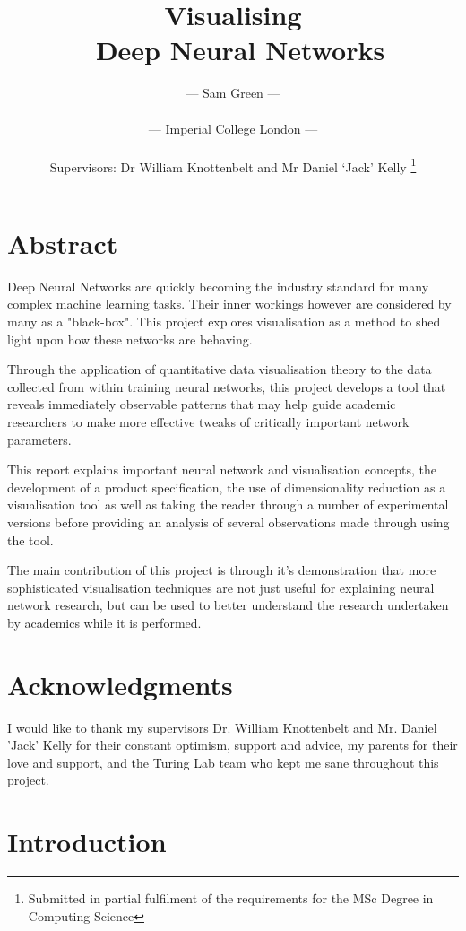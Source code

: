 \documentclass[a4paper,11pt,titlepage]{article}
\title{Visualising 
		\\\ Deep Neural Networks
		}
\author{
 \Large{--- Sam Green ---}
 \\
 \\
 \small{--- Imperial College London ---}
 \\
 \\
 \small{Supervisors: Dr William Knottenbelt and Mr Daniel `Jack' Kelly}
\thanks{Submitted in partial fulfilment of the requirements for the MSc Degree in Computing Science}
}
\begin{document}
\onehalfspacing

\maketitle

\clearpage
\clearpage

\section*{Abstract}
Deep Neural Networks are quickly becoming the industry standard for many complex machine learning tasks. Their inner workings however are considered by many as a "black-box". This project explores visualisation as a method to shed light upon how these networks are behaving. 
\par 
Through the application of quantitative data visualisation theory to the data collected from within training neural networks, this project develops a tool that reveals immediately observable patterns that may help guide academic researchers to make more effective tweaks of critically important network parameters.
\par 
This report explains important neural network and visualisation concepts, the development of a product specification, the use of dimensionality reduction as a visualisation tool as well as taking the reader through a number of experimental versions before providing an analysis of several observations made through using the tool.
\par 
The main contribution of this project is through it's demonstration that more sophisticated visualisation techniques are not just useful for explaining neural network research, but can be used to better understand the research undertaken by academics while it is performed.

\clearpage

\section*{Acknowledgments}
I would like to thank my supervisors Dr. William Knottenbelt and Mr. Daniel 'Jack' Kelly for their constant optimism, support and advice, my parents for their love and support, and the Turing Lab team who kept me sane throughout this project.

\clearpage

\tableofcontents

\clearpage

\section{Introduction}
\end{document}
